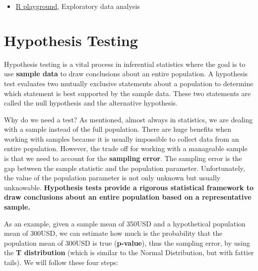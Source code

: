 \documentclass[
]{svmono}
\providecommand{\tightlist}{%
  \setlength{\itemsep}{0pt}\setlength{\parskip}{0pt}}
\begin{document}
\begin{itemize}
\tightlist
\item
  \href{https://federicoroscioli.shinyapps.io/exercises/}{R playground},
  Exploratory data analysis
\end{itemize}

\newpage

\hypertarget{hypothesis-testing}{%
\chapter{Hypothesis Testing}\label{hypothesis-testing}}

Hypothesis testing is a vital process in inferential statistics where
the goal is to use \textbf{sample data} to draw conclusions about an entire
population. A hypothesis test evaluates two mutually exclusive
statements about a population to determine which statement is best
supported by the sample data. These two statements are called the null
hypothesis and the alternative hypothesis.

Why do we need a test? As mentioned, almost always in statistics, we are
dealing with a sample instead of the full population. There are huge
benefits when working with samples because it is usually impossible to
collect data from an entire population. However, the trade off for
working with a manageable sample is that we need to account for the
\textbf{sampling error}. The sampling error is the gap between the sample
statistic and the population parameter. Unfortunately, the value of the
population parameter is not only unknown but usually unknowable.
\textbf{Hypothesis tests provide a rigorous statistical framework to draw
conclusions about an entire population based on a representative
sample.}

As an example, given a sample mean of 350USD and a hypothetical
population mean of 300USD, we can estimate how much is the probability
that the population mean of 300USD is true (\textbf{p-value}), thus the
sampling error, by using the \textbf{T distribution} (which is similar to the
Normal Distribution, but with fattier tails). We will follow these four
steps:
\end{document}
